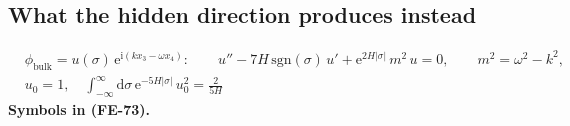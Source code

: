 \documentclass[
  10pt,
]{article}
\begin{document}
\hypertarget{what-the-hidden-direction-produces-instead}{%
\subsection{What the hidden direction produces
instead}\label{what-the-hidden-direction-produces-instead}}

\[
\begin{aligned}
&\phi_{\mathrm{bulk}} = u(\sigma)\,\mathrm{e}^{\mathrm{i}(kx_3 - \omega x_4)}:\qquad
u'' - 7H\,\mathrm{sgn}(\sigma)\,u' + \mathrm{e}^{2H\lvert\sigma\rvert}\,m^2\,u = 0,\qquad m^2 = \omega^2 - k^2,\\
&u_0 = 1,\quad \int_{-\infty}^{\infty}\mathrm{d}\sigma\,\mathrm{e}^{-5H\lvert\sigma\rvert}\,u_0^2 = \frac{2}{5H}
\end{aligned} \tag{FE-73}
\] \textbf{Symbols in (FE-73).}
\end{document}
